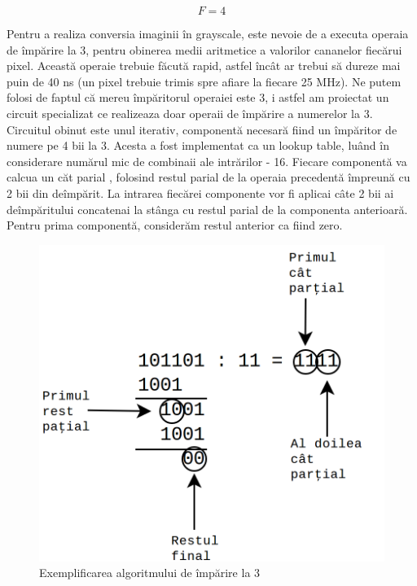 \documentclass[a4paper,11pt,romanian]{article}
\begin{document}
{\[F = 4\]

Pentru a realiza conversia imaginii \^{i}n grayscale, este nevoie de a executa operaia de \^{i}mp\u{a}rire la 3, pentru obinerea medii aritmetice a valorilor cananelor fiec\u{a}rui pixel.
Aceast\u{a} operaie trebuie f\u{a}cut\u{a} rapid, astfel \^{i}nc\^{a}t ar trebui s\u{a} dureze mai puin de 40 ns (un pixel trebuie trimis spre afiare la fiecare 25 MHz).
Ne putem folosi de faptul c\u{a} mereu \^{i}mp\u{a}ritorul operaiei este 3, i astfel am proiectat un circuit specializat ce realizeaza doar operaii de \^{i}mp\u{a}rire a numerelor la 3.
Circuitul obinut este unul iterativ, component\u{a} necesar\u{a} fiind un \^{i}mp\u{a}ritor de numere pe 4 bii la 3. Acesta a fost implementat ca un lookup table, lu\^{a}nd \^{i}n considerare num\u{a}rul mic de combinaii ale intr\u{a}rilor - 16.
Fiecare component\u{a} va calcua un c\u{a}t parial , folosind restul parial de la operaia precedent\u{a} \^{i}mpreun\u{a} cu 2 bii din de\^{i}mp\u{a}rit.
La intrarea fiec\u{a}rei componente vor fi aplicai c\^{a}te 2 bii ai de\^{i}mp\u{a}ritului concatenai la st\^{a}nga cu restul parial de la componenta anterioar\u{a}. Pentru prima component\u{a}, consider\u{a}m restul anterior ca fiind zero.

 \begin{figure}
  \begin{center}
   \includegraphics[scale=0.25]{impartire.png}
   \caption{Exemplificarea algoritmului de \^{i}mp\u{a}rire la 3}
   \label{fig:division3}
  \end{center}
 \end{figure}

}
\end{document}
